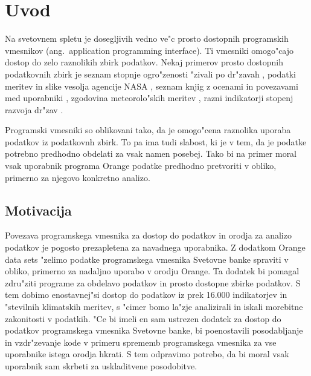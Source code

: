 
\chapter{Uvod}

Na svetovnem spletu je dosegljivih vedno ve"c prosto dostopnih programskih
vmesnikov (ang.\ application programming interface). 
Ti vmesniki omogo"cajo dostop
do zelo raznolikih zbirk podatkov. Nekaj primerov prosto dostopnih podatkovnih
zbirk je seznam stopnje ogro"zenosti "zivali po dr"zavah 
    ,
podatki meritev in slike vesolja agencije NASA
    ,
seznam knjig z ocenami in povezavami med uporabniki 
    ,
zgodovina meteorolo"skih meritev 
    ,
razni indikatorji stopenj razvoja dr"zav
    .

Programski vmesniki so oblikovani tako, da je omogo"cena raznolika uporaba
podatkov iz podatkovnh zbirk. To pa ima tudi slabost, ki je v tem, da je podatke
potrebno predhodno obdelati za vsak namen posebej. Tako bi na primer moral vsak
uporabnik programa Orange podatke predhodno pretvoriti v obliko, primerno za
njegovo konkretno analizo.


\section{Motivacija}


Povezava programskega vmesnika za dostop do podatkov in orodja za analizo 
podatkov je pogosto prezapletena za navadnega uporabnika. Z dodatkom Orange
data sets "zelimo podatke programskega vmesnika Svetovne banke spraviti v 
obliko, primerno za nadaljno
uporabo v orodju Orange. Ta dodatek bi pomagal zdru"ziti programe za obdelavo
podatkov in prosto dostopne zbirke podatkov. S tem dobimo enostavnej"si dostop do
podatkov iz prek 16.000 indikatorjev in "stevilnih klimatskih meritev,
s "cimer bomo la"zje analizirali in iskali morebitne zakonitosti v podatkih.
"Ce bi imeli en sam ustrezen dodatek za dostop do podatkov programskega 
vmesnika Svetovne banke, bi poenostavili posodabljanje in
vzdr"zevanje kode v primeru sprememb programskega vmesnika za vse uporabnike
istega orodja hkrati. S tem odpravimo potrebo, da bi moral vsak uporabnik sam
skrbeti za uskladitvene posodobitve.



